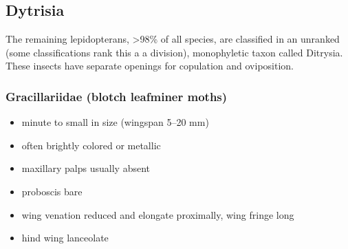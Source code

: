 \documentclass[letterpaper, 11pt]{article}
\begin{document}
\subsection{Dytrisia}
The remaining lepidopterans, \textgreater98\% of all species, are classified in an unranked (some classifications rank this a a division), monophyletic taxon called Ditrysia. These insects have separate openings for copulation and oviposition.

\subsubsection{Gracillariidae (blotch leafminer moths)}
\begin{itemize}
\item minute to small in size (wingspan 5--20 mm)
\item often brightly colored or metallic
\item maxillary palps usually absent
\item proboscis bare 
\item wing venation reduced and elongate proximally, wing fringe long
\item hind wing lanceolate
\end{itemize}
\end{document}
